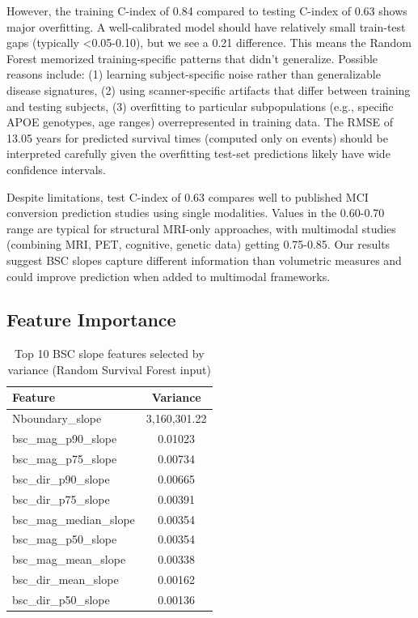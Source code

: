 \documentclass[blue]{ludusofficial}  %
\begin{document}
However, the training C-index of 0.84 compared to testing C-index of 0.63 shows major overfitting. A well-calibrated model should have relatively small train-test gaps (typically <0.05-0.10), but we see a 0.21 difference. This means the Random Forest memorized training-specific patterns that didn't generalize. Possible reasons include: (1) learning subject-specific noise rather than generalizable disease signatures, (2) using scanner-specific artifacts that differ between training and testing subjects, (3) overfitting to particular subpopulations (e.g., specific APOE genotypes, age ranges) overrepresented in training data. The RMSE of 13.05 years for predicted survival times (computed only on events) should be interpreted carefully given the overfitting test-set predictions likely have wide confidence intervals.

Despite limitations, test C-index of 0.63 compares well to published MCI conversion prediction studies using single modalities. Values in the 0.60-0.70 range are typical for structural MRI-only approaches, with multimodal studies (combining MRI, PET, cognitive, genetic data) getting 0.75-0.85. Our results suggest BSC slopes capture different information than volumetric measures and could improve prediction when added to multimodal frameworks.

\subsection{Feature Importance}

\begin{table}[h!]
\centering
\caption{Top 10 BSC slope features selected by variance (Random Survival Forest input)}
\label{tab:top-features}
\begin{tabular}{lc}
\hline
\textbf{Feature} & \textbf{Variance} \\
\hline
Nboundary\_slope & 3,160,301.22 \\
bsc\_mag\_p90\_slope & 0.01023 \\
bsc\_mag\_p75\_slope & 0.00734 \\
bsc\_dir\_p90\_slope & 0.00665 \\
bsc\_dir\_p75\_slope & 0.00391 \\
bsc\_mag\_median\_slope & 0.00354 \\
bsc\_mag\_p50\_slope & 0.00354 \\
bsc\_mag\_mean\_slope & 0.00338 \\
bsc\_dir\_mean\_slope & 0.00162 \\
bsc\_dir\_p50\_slope & 0.00136 \\
\hline
\end{tabular}
\end{table}
\end{document}
